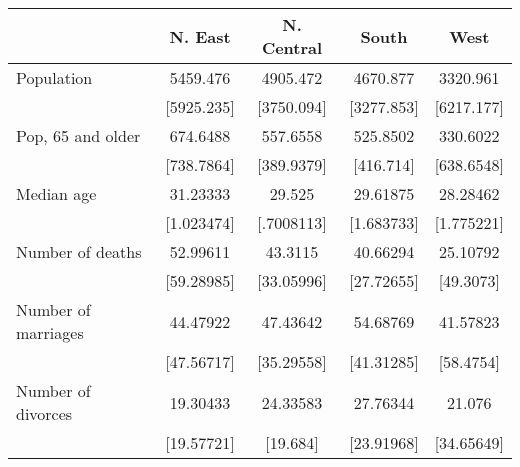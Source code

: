 \begin{tabular}{l*{4}{c}}
\toprule
                &  N. East&N. Central&    South&     West\\
\midrule
Population      & 5459.476& 4905.472& 4670.877& 3320.961\\
                &[5925.235]&[3750.094]&[3277.853]&[6217.177]\\
\addlinespace
Pop, 65 and older& 674.6488& 557.6558& 525.8502& 330.6022\\
                &[738.7864]&[389.9379]&[416.714]&[638.6548]\\
\addlinespace
Median age      & 31.23333&   29.525& 29.61875& 28.28462\\
                &[1.023474]&[.7008113]&[1.683733]&[1.775221]\\
\addlinespace
Number of deaths& 52.99611&  43.3115& 40.66294& 25.10792\\
                &[59.28985]&[33.05996]&[27.72655]&[49.3073]\\
\addlinespace
Number of marriages& 44.47922& 47.43642& 54.68769& 41.57823\\
                &[47.56717]&[35.29558]&[41.31285]&[58.4754]\\
\addlinespace
Number of divorces& 19.30433& 24.33583& 27.76344&   21.076\\
                &[19.57721]& [19.684]&[23.91968]&[34.65649]\\
\bottomrule
\end{tabular}
